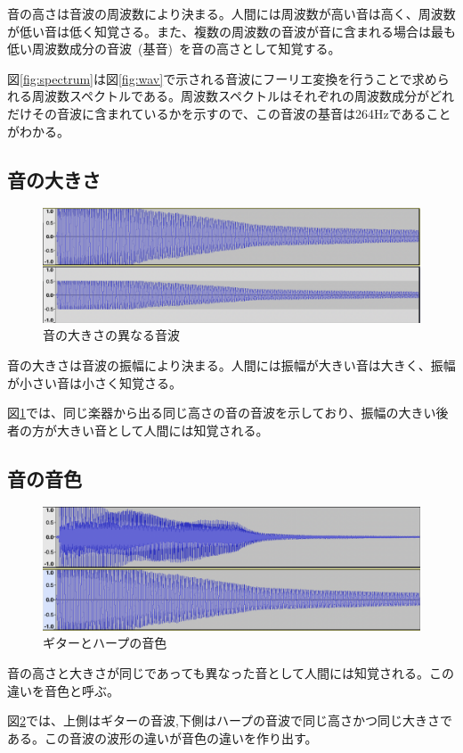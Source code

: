 音の高さは音波の周波数により決まる。人間には周波数が高い音は高く、周波数が低い音は低く知覚さる。また、複数の周波数の音波が音に含まれる場合は最も低い周波数成分の音波~(基音)~を音の高さとして知覚する。

図\ref{fig:spectrum}は図\ref{fig:wav}で示される音波にフーリエ変換を行うことで求められる周波数スペクトルである。周波数スペクトルはそれぞれの周波数成分がどれだけその音波に含まれているかを示すので、この音波の基音は264Hzであることがわかる。

\subsection{音の大きさ}

\begin{figure}[ht]
\begin{center}
\includegraphics[width=0.7\hsize]{figure/c4_harp_loudness.png}
\caption{音の大きさの異なる音波}
\label{fig:loudness}
\end{center}
\end{figure}

音の大きさは音波の振幅により決まる。人間には振幅が大きい音は大きく、振幅が小さい音は小さく知覚さる。

図\ref{fig:loudness}では、同じ楽器から出る同じ高さの音の音波を示しており、振幅の大きい後者の方が大きい音として人間には知覚される。

\subsection{音の音色}

\begin{figure}[ht]
\begin{center}
\includegraphics[width=0.7\hsize]{figure/c4_guitar_harp.png}
\caption{ギターとハープの音色}
\label{fig:guitar_harp_comp}
\end{center}
\end{figure}

音の高さと大きさが同じであっても異なった音として人間には知覚される。この違いを音色と呼ぶ。

図\ref{fig:guitar_harp_comp}では、上側はギターの音波,下側はハープの音波で同じ高さかつ同じ大きさである。この音波の波形の違いが音色の違いを作り出す。
